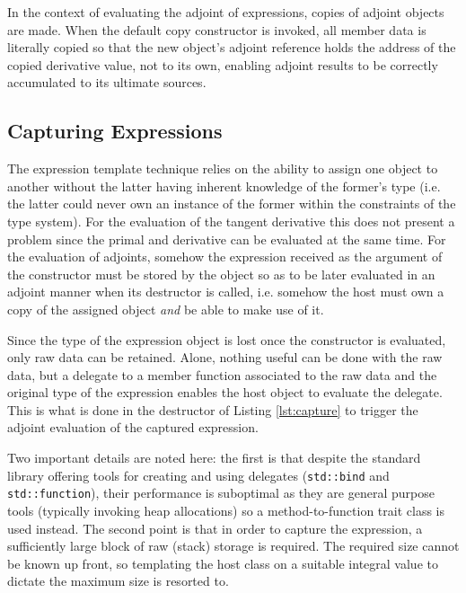 \documentclass[a4paper,10pt]{article}
\begin{document}
In the context of evaluating the adjoint of expressions, copies of adjoint objects are made. When the default copy constructor is invoked, all member data is literally copied so that the new object's adjoint reference holds the address of the copied derivative value, not to its own, enabling adjoint results to be correctly accumulated to its ultimate sources.

\subsection{Capturing Expressions}
The expression template technique relies on the ability to assign one object to another without the latter having inherent knowledge of the former's type (i.e. the latter could never own an instance of the former within the constraints of the type system). For the evaluation of the tangent derivative this does not present a problem since the primal and derivative can be evaluated at the same time. For the evaluation of adjoints, somehow the expression received as the argument of the constructor must be stored by the object so as to be later evaluated in an adjoint manner when its destructor is called, i.e. somehow the host must own a copy of the assigned object \emph{and} be able to make use of it.

Since the type of the expression object is lost once the constructor is evaluated, only raw data can be retained. Alone, nothing useful can be done with the raw data, but a delegate to a member function associated to the raw data and the original type of the expression enables the host object to evaluate the delegate. This is what is done in the destructor of Listing \ref{lst:capture} to trigger the adjoint evaluation of the captured expression.

Two important details are noted here: the first is that despite the standard library offering tools for creating and using delegates (\texttt{std::bind} and \texttt{std::function}), their performance is suboptimal as they are general purpose tools (typically invoking heap allocations) so a method-to-function trait class is used instead. The second point is that in order to capture the expression, a sufficiently large block of raw (stack) storage is required. The required size cannot be known up front, so templating the host class on a suitable integral value to dictate the maximum size is resorted to.
\end{document}
